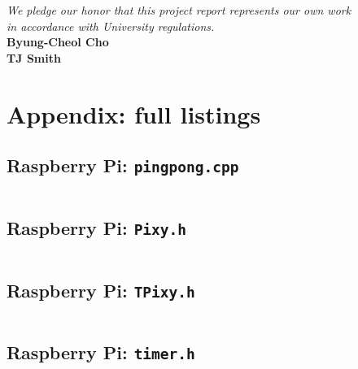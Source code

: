 \documentclass[letterpaper, 11pt]{article}
\begin{document}
\vfill
\begin{flushright}
    \textit{We pledge our honor that this project report represents our own work \\ in accordance with University regulations.} \\
    \textbf{Byung-Cheol Cho} \\
    \textbf{TJ Smith}
\end{flushright}

\clearpage
\section{Appendix: full listings}
\cftsubsubsecindent 0pt
\localtableofcontents

\subsection{Raspberry Pi: \texttt{pingpong.cpp}}
\begin{mdframed}[backgroundcolor=bg]
    \inputminted[breaklines]{cpp}{files/src/rpi/pingpong.cpp}
\end{mdframed}

\subsection{Raspberry Pi: \texttt{Pixy.h}}
\begin{mdframed}[backgroundcolor=bg]
    \inputminted[breaklines]{cpp}{files/src/rpi/Pixy.h}
\end{mdframed}

\subsection{Raspberry Pi: \texttt{TPixy.h}}
\begin{mdframed}[backgroundcolor=bg]
    \inputminted[breaklines]{cpp}{files/src/rpi/TPixy.h}
\end{mdframed}

\subsection{Raspberry Pi: \texttt{timer.h}}
\begin{mdframed}[backgroundcolor=bg]
    \inputminted[breaklines]{cpp}{files/src/rpi/timer.h}
\end{mdframed}
\end{document}
